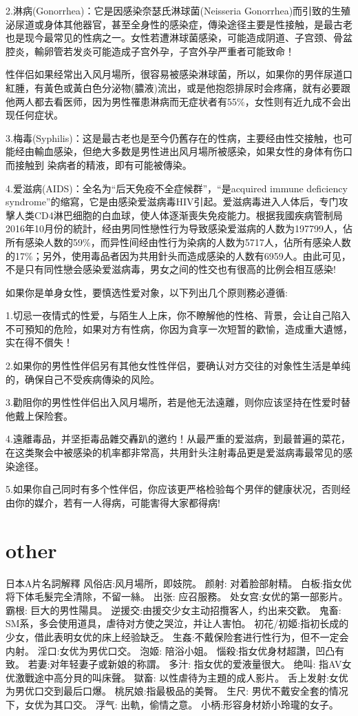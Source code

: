 \documentclass[12pt,UTF8]{ctexbook}
\begin{document}
2.淋病(Gonorrhea)：它是因感染奈瑟氏淋球菌(Neisseria Gonorrhea)而引致的生殖泌尿道或身体其他器官，甚至全身性的感染症，傳染途径主要是性接触，是最古老也是现今最常见的性病之一。女性若遭淋球菌感染，可能造成阴道、子宫颈、骨盆腔炎，輸卵管若发炎可能造成子宫外孕，子宫外孕严重者可能致命！

性伴侣如果经常出入风月場所，很容易被感染淋球菌，所以，如果你的男伴尿道口紅腫，有黃色或黃白色分泌物(膿液)流出，或是他抱怨排尿时会疼痛，就有必要跟他两人都去看医师，因为男性罹患淋病而无症状者有55\%，女性则有近九成不会出现任何症状。

3.梅毒(Syphilis)：这是最古老也是至今仍舊存在的性病，主要经由性交接触，也可能经由輸血感染，但绝大多数是男性进出风月場所被感染，如果女性的身体有伤口而接触到
染病者的精液，即有可能被傳染。

4.爱滋病(AIDS)：全名为“后天免疫不全症候群”，“是acquired immune deficiency syndrome”的缩寫，它是由感染爱滋病毒HIV引起。爱滋病毒进入人体后，专门攻擊人类CD4淋巴细胞的白血球，使人体逐渐喪失免疫能力。根据我國疾病管制局2016年10月份的統計，经由男同性戀性行为导致感染爱滋病的人数为197799人，佔所有感染人数的59\%，而异性间经由性行为染病的人数为5717人，佔所有感染人数的17\%；另外，使用毒品者因为共用針头而造成感染的人数有6959人。由此可见，不是只有同性戀会感染爱滋病毒，男女之间的性交也有很高的比例会相互感染!

如果你是单身女性，要慎选性爱对象，以下列出几个原则務必遵循:

1.切忌一夜情式的性爱，与陌生人上床，你不瞭解他的性格、背景，会让自己陷入不可預知的危险，如果对方有性病，你因为貪享一次短暂的歡愉，造成重大遺憾，实在得不償失！

2.如果你的男性性伴侣另有其他女性性伴侣，要确认对方交往的对象性生活是单纯的，确保自己不受疾病傳染的风险。

3.勸阻你的男性性伴侣出入风月場所，若是他无法遠離，则你应该坚持在性爱时替他戴上保险套。

4.遠離毒品，并坚拒毒品雜交轟趴的邀约！从最严重的爱滋病，到最普遍的菜花，在这类聚会中被感染的机率都非常高，共用針头注射毒品更是爱滋病毒最常见的感染途径。

5.如果你自己同时有多个性伴侣，你应该更严格检验每个男伴的健康状况，否则经由你的媒介，若有一人得病，可能害得大家都得病!

\part{other}

日本A片名詞解釋
风俗店:风月場所，即妓院。
颜射: 对着脸部射精。
白板:指女优将下体毛髮完全清除，不留一絲。
出张: 应召服務。
处女宫:女优的第一部影片。
霸根: 巨大的男性陽具。
逆援交:由援交少女主动招攬客人，约出来交歡。
鬼畜: SM系，多会使用道具，虐待对方使之哭泣，并让人害怕。
初花/初姬:指初长成的少女，借此表明女优的床上经验缺乏。
生姦:不戴保险套进行性行为，但不一定会内射。
淫口:女优为男优口交。
泡姬: 陪浴小姐。
惱殺:指女优身材超讚，凹凸有致。
若妻:对年轻妻子或新娘的称謂。
多汁: 指女优的爱液量很大。
绝叫: 指AV女优激戰途中高分貝的叫床聲。
獄畜: 以性虐待为主題的成人影片。
舌上发射:女优为男优口交到最后口爆。
桃尻娘:指最极品的美臀。
生尺: 男优不戴安全套的情况下，女优为其口交。
浮气: 出軌，偷情之意。
小柄:形容身材娇小玲瓏的女子。
\end{document}
